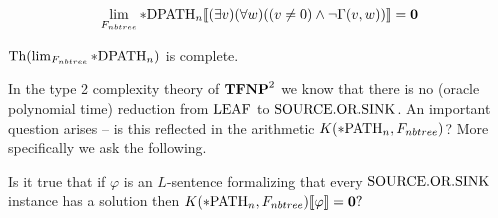 \begin{thrm}
\[\lim_{F_{nbtree}}*\text{DPATH}_n\llbracket(\exists v)(\forall w)((v\not=0)\land \lnot\Gamma(v,w))\rrbracket=\textbf{0}\]
\end{thrm}

\begin{crll}\label{crllpDPATH}
$\text{Th}(\lim_{F_{nbtree}}*\text{DPATH}_n)$ is complete.
\end{crll}

In the type 2 complexity theory of $\textbf{TFNP}^2$ we know that there is no (oracle polynomial time) reduction from $\text{LEAF}$ to $\text{SOURCE.OR.SINK}$. An important question arises -- is this reflected in the arithmetic $K(*\text{PATH}_n,F_{nbtree})$? More specifically we ask the following.

\begin{ques}
Is it true that if $\varphi$ is an $L$-sentence formalizing that every $\text{SOURCE.OR.SINK}$ instance has a solution then
$K(*\text{PATH}_n,F_{nbtree})\llbracket\varphi\rrbracket=\textbf{0}?$
\end{ques}
